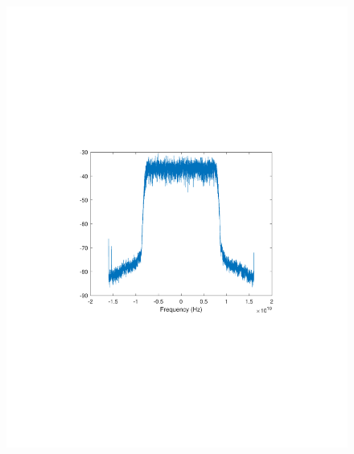\begin{refsection}
\begin{figure}[H]
	\centering
	\begin{minipage}{0.30\textwidth}
		\centering
		\includegraphics[clip, trim=4cm 8cm 4cm 8cm, width=1\textwidth]{./sdf/m_qam_system/figures/expResults/intradyne/6_16GBdInSig13dB_AfMIMO2.pdf}
		\label{fig:16GBdEyeMIMO2}
	\end{minipage}
	\begin{minipage}{0.30\textwidth}
		\centering

\end{minipage}
\end{figure}
\end{refsection}
